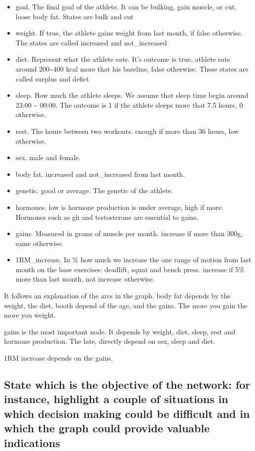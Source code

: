 \documentclass[11pt]{article}
\begin{document}
\begin{itemize}
\item
  goal. The final goal of the athlete. It can be bulking, gain muscle, or
  cut, loose body fat. States are bulk and cut
\item
  weight. If true, the athlete gains weight from last month, if false
  otherwise. The states are called increased and not\_increased
\item
  diet. Represent what the athlete eats. It's outcome is true, athlete
  eats around 200\textasciitilde{}400 kcal more that his baseline, false
  otherwise. These states are called surplus and defict
\item
  sleep. How much the athlete sleeps. We assume that sleep time begin
  around 23:00 \textasciitilde{} 00:00. The outcome is 1 if the athlete
  sleeps more that 7.5 hours, 0 otherwise.
\item
  rest. The hours between two workouts. enough if more than 36 hours,
  low otherwise.
\item
  sex. male and female.
\item
  body fat. increased and not\_increased from last month.
\item
  genetic. good or average. The genetic of the athlete.
\item
  hormones. low is hormone production is under average, high if more.
  Hormones such as gh and testosterone are essential to gains.
\item
  gains. Measured in grams of muscle per month. increase if more than
  300g, same otherwise.
\item
  1RM\_increase. In \% how much we increase the one range of motion from
  last month on the base exercises: deadlift, squat and bench press.
  increase if 5\% more than last month, not increase otherwise.
\end{itemize}

It follows an explanation of the arcs in the graph. body fat depends by
the weight, the diet, booth depend of the age, and the gains. The more
you gain the more you weight.

gains is the most important node. It depends by weight, diet, sleep,
rest and hormone production. The late, directly depend on sex, sleep and
diet.

1RM increase depends on the gains.

\subsection{State which is the objective of the network: for instance, highlight a couple of situations in which decision making could be difficult and in which the graph could provide valuable indications}
\end{document}
